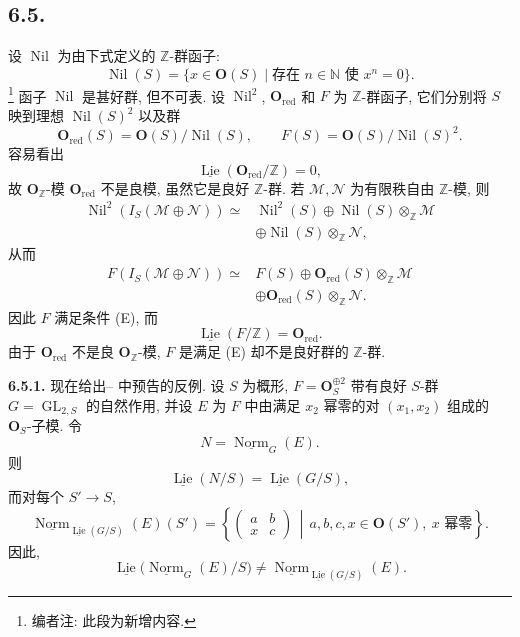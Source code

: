 \subsection*{6.5.}
设 \(\operatorname{Nil}\) 为由下式定义的 \(\mathbb Z\)-群函子:
\[
 \operatorname{Nil}(S)
 =\{x\in\mathbf O(S)\mid
       \text{存在 }n\in\mathbb N\text{ 使 }x^n=0\}.
\]
\footnote{编者注: 此段为新增内容.}
函子 \(\operatorname{Nil}\) 是甚好群, 但不可表.
设 \(\operatorname{Nil}^2\), \(\mathbf O_{\mathrm{red}}\) 和 \(F\) 为
\(\mathbb Z\)-群函子, 它们分别将 \(S\) 映到理想
\(\operatorname{Nil}(S)^2\) 以及群
\[
 \mathbf O_{\mathrm{red}}(S)
   =\mathbf O(S)/\operatorname{Nil}(S),
 \qquad
 F(S)=\mathbf O(S)/\operatorname{Nil}(S)^2.
\]
容易看出
\[
 \underline{\operatorname{Lie}}
   (\mathbf O_{\mathrm{red}}/\mathbb Z)=0,
\]
故 \(\mathbf O_{\mathbb Z}\)-模
\(\mathbf O_{\mathrm{red}}\) 不是良模, 虽然它是良好
\(\mathbb Z\)-群. 若 \(\mathscr M,\mathscr N\) 为有限秩自由
\(\mathbb Z\)-模, 则
\[
\begin{split}
 \operatorname{Nil}^2(I_S(\mathscr M\oplus\mathscr N))
 \simeq{}&
 \operatorname{Nil}^2(S)
 \oplus\operatorname{Nil}(S)\otimes_{\mathbb Z}\mathscr M\\
 &\oplus\operatorname{Nil}(S)\otimes_{\mathbb Z}\mathscr N,
\end{split}
\]
从而
\[
\begin{split}
 F(I_S(\mathscr M\oplus\mathscr N))
 \simeq{}&F(S)
 \oplus\mathbf O_{\mathrm{red}}(S)\otimes_{\mathbb Z}\mathscr M\\
 &\oplus\mathbf O_{\mathrm{red}}(S)\otimes_{\mathbb Z}\mathscr N.
\end{split}
\]
因此 \(F\) 满足条件 (E), 而
\[
 \underline{\operatorname{Lie}}(F/\mathbb Z)
   =\mathbf O_{\mathrm{red}}.
\]
由于 \(\mathbf O_{\mathrm{red}}\) 不是良
\(\mathbf O_{\mathbb Z}\)-模, \(F\) 是满足 (E) 却不是良好群的
\(\mathbb Z\)-群.

\medskip
\noindent{}\textbf{6.5.1.}
现在给出-- 中预告的反例.
设 \(S\) 为概形, \(F=\mathbf O_S^{\oplus2}\) 带有良好
\(S\)-群 \(G=\operatorname{GL}_{2,S}\) 的自然作用,
并设 \(E\) 为 \(F\) 中由满足 \(x_2\) 幂零的对
\((x_1,x_2)\) 组成的 \(\mathbf O_S\)-子模. 令
\[
 N=\underline{\operatorname{Norm}}_G(E).
\]
则
\[
 \underline{\operatorname{Lie}}(N/S)
   =\underline{\operatorname{Lie}}(G/S),
\]
而对每个 \(S'\to S\),
\[
 \underline{\operatorname{Norm}}_
   {\underline{\operatorname{Lie}}(G/S)}(E)(S')
 =
 \left\{
 \begin{pmatrix}a&b\\x&c\end{pmatrix}
 \,\middle|\,
 a,b,c,x\in\mathbf O(S'),\ x\text{ 幂零}
 \right\}.
\]
因此,
\[
 \underline{\operatorname{Lie}}
   \bigl(\underline{\operatorname{Norm}}_G(E)/S\bigr)
 \neq
 \underline{\operatorname{Norm}}_
   {\underline{\operatorname{Lie}}(G/S)}(E).
\]

